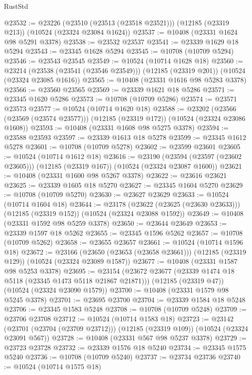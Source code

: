 \begin{lexlean}{RustStd}
\begin{coremodule}
@23532 := @23226
    (@23510 (@23513 (@23518 @23521)))
    (@12185 (@23319 @213))
    (@10524 (@23324 @23084 @1624))
@23537 := @10408 (@23331 @1624 @98 @5291 @3378)
@23538 := @23532 @23537
@23541 := @23339 @1629 @18 @5294
@23543 := @23345 @1628 @5294
@23545 := @10708 (@10709 @5294)
@23546 := @23543 @23545
@23549 := @10524 (@10714 @1628 @18)
@23560 := @23214
    (@23538 (@23541 (@23546 @23549)))
    (@12185 (@23319 @201))
    (@10524 (@23324 @23085 @1616))
@23565 := @10408 (@23331 @1616 @98 @5283 @3378)
@23566 := @23560 @23565
@23569 := @23339 @1621 @18 @5286
@23571 := @23345 @1620 @5286
@23573 := @10708 (@10709 @5286)
@23574 := @23571 @23573
@23577 := @10524 (@10714 @1620 @18)
@23588 := @23202
    (@23566 (@23569 (@23574 @23577)))
    (@12185 (@23319 @172))
    (@10524 (@23324 @23086 @1608))
@23593 := @10408 (@23331 @1608 @98 @5275 @3378)
@23594 := @23588 @23593
@23597 := @23339 @1613 @18 @5278
@23599 := @23345 @1612 @5278
@23601 := @10708 (@10709 @5278)
@23602 := @23599 @23601
@23605 := @10524 (@10714 @1612 @18)
@23616 := @23190
    (@23594 (@23597 (@23602 @23605)))
    (@12185 (@23319 @167))
    (@10524 (@23324 @23087 @1600))
@23621 := @10408 (@23331 @1600 @98 @5267 @3378)
@23622 := @23616 @23621
@23625 := @23339 @1605 @18 @5270
@23627 := @23345 @1604 @5270
@23629 := @10708 (@10709 @5270)
@23630 := @23627 @23629
@23633 := @10524 (@10714 @1604 @18)
@23644 := @23178
    (@23622 (@23625 (@23630 @23633)))
    (@12185 (@23319 @152))
    (@10524 (@23324 @23088 @1592))
@23649 := @10408 (@23331 @1592 @98 @5259 @3378)
@23650 := @23644 @23649
@23653 := @23339 @1597 @18 @5262
@23655 := @23345 @1596 @5262
@23657 := @10708 (@10709 @5262)
@23658 := @23655 @23657
@23661 := @10524 (@10714 @1596 @18)
@23672 := @23166
    (@23650 (@23653 (@23658 @23661)))
    (@12185 (@23319 @129))
    (@10524 (@23324 @23089 @1587))
@23677 := @10408 (@23331 @1587 @98 @5253 @3378)
@23695 := @23154
    (@23672 @23677 (@23339 @1474 @18 @5118 (@23345 @1473 @5118 @21867 @21871)))
    (@12185 (@23319 @47))
    (@10524 (@23324 @23090 @1579))
@23700 := @10408 (@23331 @1579 @98 @5245 @3378)
@23701 := @23695 @23700
@23704 := @23339 @1584 @18 @5248
@23706 := @23345 @1583 @5248
@23708 := @10708 (@10709 @5248)
@23709 := @23706 @23708
@23712 := @10524 (@10714 @1583 @18)
@23723 := @23142
    (@23701 (@23704 (@23709 @23712)))
    (@12185 (@23319 @109))
    (@10524 (@23324 @23091 @567))
@23728 := @10408 (@23331 @567 @98 @5237 @3378)
@23729 := @23723 @23728
@23732 := @23339 @1576 @18 @5240
@23734 := @23345 @1575 @5240
@23736 := @10708 (@10709 @5240)
@23737 := @23734 @23736
@23740 := @10524 (@10714 @1575 @18)

\end{coremodule}
\end{lexlean}
